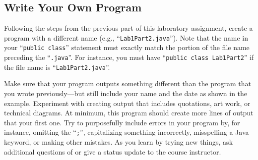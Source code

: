 



\subsection*{Write Your Own Program}

Following the steps from the previous part of this laboratory assignment, create a program with a different name (e.g.,
``{\tt Lab1Part2.java}''). Note that the name in your ``{\tt public class}'' statement must exactly match the portion of
the file name preceding the ``{\tt .java}''.  For instance, you must have ``{\tt public class Lab1Part2}'' if the file
name is ``{\tt Lab1Part2.java}''.

Make sure that your program outputs something different than the program that you wrote previously---but still include
your name and the date as shown in the example. Experiment with creating output that includes quotations, art work, or
technical diagrams.  At minimum, this program should create more lines of output that your first one. Try to
purposefully include errors in your program by, for instance, omitting the ``{\tt ;}'', capitalizing something
incorrectly, misspelling a Java keyword, or making other mistakes. As you learn by trying new things, ask additional
questions of or give a status update to the course instructor.

